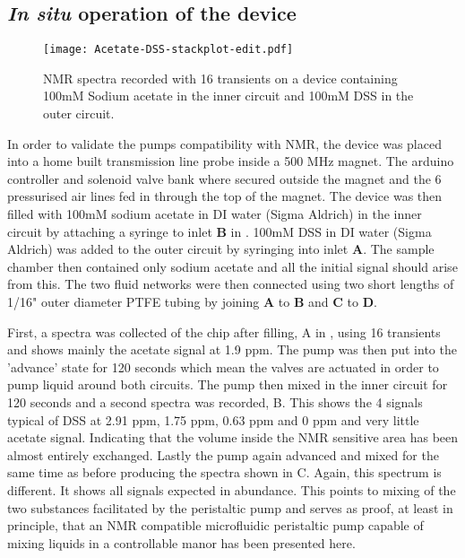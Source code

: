 \newpage
\newpage

\subsection{\textit{In situ} operation of the device}

\begin{figure}[ht]
  \begin{center}
  \texttt{[image: Acetate-DSS-stackplot-edit.pdf]}
  \caption{NMR spectra recorded with 16 transients on a device containing 100mM Sodium
  acetate in the inner circuit and 100mM DSS in the outer circuit.}
  \label{fig:spectra}
  \end{center}
\end{figure}

In order to validate the pumps compatibility with NMR, the device was placed into a home
built transmission line probe inside a 500 MHz magnet. The arduino controller and solenoid valve
bank where secured outside the magnet and the 6 pressurised air lines fed in through the top of
the magnet. The device was then filled with 100mM sodium acetate in DI water (Sigma Aldrich) in
the inner circuit by attaching a syringe to inlet \textbf{B} in . 100mM DSS in DI
water (Sigma Aldrich) was added to the outer circuit by syringing into inlet \textbf{A}. The sample
chamber then contained only sodium acetate and all the initial signal should arise from this. The two fluid networks
were then connected using two short lengths of 1/16" outer diameter PTFE tubing by joining
\textbf{A} to \textbf{B} and \textbf{C} to \textbf{D}.

First, a spectra was collected of the chip after filling, A in , using 16
transients and shows mainly the acetate signal at 1.9 ppm. The pump was then put into
the 'advance' state for 120 seconds which mean the valves are actuated in order to pump
liquid around both circuits. The pump then mixed in the inner circuit for 120 seconds
and a second spectra was recorded, B. This shows the 4 signals typical of DSS at 2.91
ppm, 1.75 ppm, 0.63 ppm and 0 ppm and very little acetate signal. Indicating that the
volume inside the NMR sensitive area has been almost entirely exchanged. Lastly the
pump again advanced and mixed for the same time as before producing the spectra shown
in C. Again, this spectrum is different. It shows all signals expected in abundance.
This points to mixing of the two substances facilitated by the peristaltic pump and serves
as proof, at least in principle, that an NMR compatible microfluidic peristaltic pump
capable of mixing liquids in a controllable manor has been presented here.

